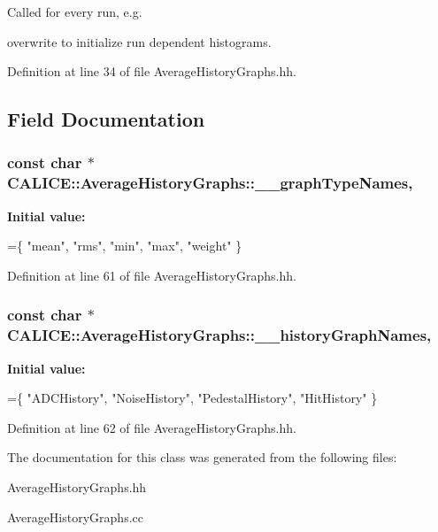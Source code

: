 Called for every run, e.\-g. 

overwrite to initialize run dependent histograms. 

Definition at line 34 of file Average\-History\-Graphs.\-hh.



\subsection{Field Documentation}
\subsubsection[{\-\_\-\-\_\-graph\-Type\-Names}]{\setlength{\rightskip}{0pt plus 5cm}const char $\ast$ C\-A\-L\-I\-C\-E\-::\-Average\-History\-Graphs\-::\-\_\-\-\_\-graph\-Type\-Names\hspace{0.3cm}{\ttfamily [static]}, {\ttfamily [protected]}}\label{classCALICE_1_1AverageHistoryGraphs_adce732f8a36e6b716ab80ff035b2603a}
{\bfseries Initial value\-:}
\begin{DoxyCode}
=\{
    \textcolor{stringliteral}{"mean"},
    \textcolor{stringliteral}{"rms"},
    \textcolor{stringliteral}{"min"},
    \textcolor{stringliteral}{"max"},
    \textcolor{stringliteral}{"weight"}
  \}
\end{DoxyCode}


Definition at line 61 of file Average\-History\-Graphs.\-hh.

\subsubsection[{\-\_\-\-\_\-history\-Graph\-Names}]{\setlength{\rightskip}{0pt plus 5cm}const char $\ast$ C\-A\-L\-I\-C\-E\-::\-Average\-History\-Graphs\-::\-\_\-\-\_\-history\-Graph\-Names\hspace{0.3cm}{\ttfamily [static]}, {\ttfamily [protected]}}\label{classCALICE_1_1AverageHistoryGraphs_a2349f46d366705d3d312fbc32febf896}
{\bfseries Initial value\-:}
\begin{DoxyCode}
=\{
    \textcolor{stringliteral}{"ADCHistory"},
    \textcolor{stringliteral}{"NoiseHistory"},
    \textcolor{stringliteral}{"PedestalHistory"},
    \textcolor{stringliteral}{"HitHistory"}
  \}
\end{DoxyCode}


Definition at line 62 of file Average\-History\-Graphs.\-hh.



The documentation for this class was generated from the following files\-:\begin{DoxyCompactItemize}
\item 
Average\-History\-Graphs.\-hh\item 
Average\-History\-Graphs.\-cc\end{DoxyCompactItemize}
